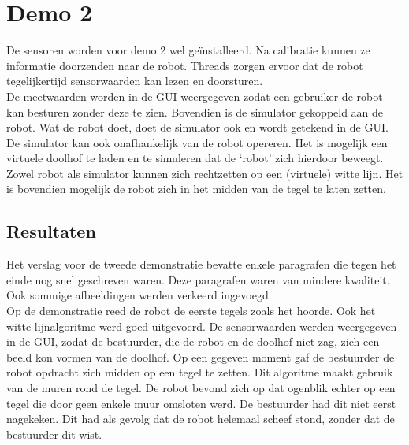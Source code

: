 \documentclass[tt3]{penoverslag}
\begin{document}


\section{Demo 2} %
\label{Asec:demo2}
De sensoren worden voor demo 2 wel ge\"installeerd. Na calibratie kunnen ze informatie doorzenden naar de robot. Threads zorgen ervoor dat de robot tegelijkertijd sensorwaarden kan lezen en doorsturen.\\

De meetwaarden worden in de GUI weergegeven zodat een gebruiker de robot kan besturen zonder deze te zien. Bovendien is de simulator gekoppeld aan de robot. Wat de robot doet, doet de simulator ook en wordt getekend in de GUI. De simulator kan ook onafhankelijk van de robot opereren. Het is mogelijk een virtuele doolhof te laden en te simuleren dat de `robot' zich hierdoor beweegt. Zowel robot als simulator kunnen zich rechtzetten op een (virtuele) witte lijn. Het is bovendien mogelijk de robot zich in het midden van de tegel te laten zetten.


\subsection{Resultaten} %
\label{Assec:result2}
Het verslag voor de tweede demonstratie bevatte enkele paragrafen die tegen het einde nog snel geschreven waren. Deze paragrafen waren van mindere kwaliteit. Ook sommige afbeeldingen werden verkeerd ingevoegd.\\

Op de demonstratie reed de robot de eerste tegels zoals het hoorde. Ook het witte lijnalgoritme werd goed uitgevoerd. De sensorwaarden werden weergegeven in de GUI, zodat de bestuurder, die de robot en de doolhof niet zag, zich een beeld kon vormen van de doolhof. Op een gegeven moment gaf de bestuurder de robot opdracht zich midden op een tegel te zetten. Dit algoritme maakt gebruik van de muren rond de tegel. De robot bevond zich op dat ogenblik echter op een tegel die door geen enkele muur omsloten werd. De bestuurder had dit niet eerst nagekeken. Dit had als gevolg dat de robot helemaal scheef stond, zonder dat de bestuurder dit wist.\\
\end{document}
